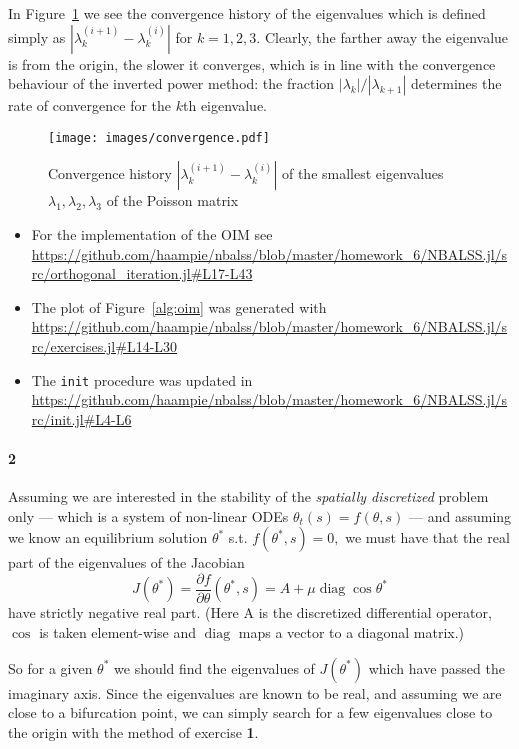 \documentclass[a4paper]{article}
\DeclareMathOperator{\diag}{diag}
\begin{document}
  In Figure~\ref{fig:lambda_conv} we see the convergence history of the eigenvalues which is defined simply as $|\lambda^{(i + 1)}_k - \lambda^{(i)}_k|$ for $k = 1, 2, 3.$ Clearly, the farther away the eigenvalue is from the origin, the slower it converges, which is in line with the convergence behaviour of the inverted power method: the fraction $|\lambda_k| / |\lambda_{k+1}|$ determines the rate of convergence for the $k$th eigenvalue.

  \begin{figure}[h]
    \caption{Convergence history $|\lambda^{(i + 1)}_k - \lambda^{(i)}_k|$ of the smallest eigenvalues $\lambda_1, \lambda_2, \lambda_3$ of the Poisson matrix}\label{fig:lambda_conv}
    \centerline{\texttt{[image: images/convergence.pdf]}}
  \end{figure}

  \begin{itemize}
    \item For the implementation of the OIM see \url{https://github.com/haampie/nbalss/blob/master/homework_6/NBALSS.jl/src/orthogonal_iteration.jl#L17-L43}
    \item The plot of Figure~\ref{alg:oim} was generated with \url{https://github.com/haampie/nbalss/blob/master/homework_6/NBALSS.jl/src/exercises.jl#L14-L30}
    \item The {\tt init} procedure was updated in \url{https://github.com/haampie/nbalss/blob/master/homework_6/NBALSS.jl/src/init.jl#L4-L6}
  \end{itemize}

  \paragraph{2} Assuming we are interested in the stability of the \emph{spatially discretized} problem only --- which is a system of non-linear ODEs $\theta_t(s) = f(\theta, s)$ --- and assuming we know an equilibrium solution $\theta^*$ s.t. $f(\theta^*, s) = 0,$ we must have that the real part of the eigenvalues of the Jacobian $$J(\theta^*) = \frac{\partial f}{\partial \theta}(\theta^*, s) = A + \mu \diag \cos \theta^*$$ have strictly negative real part. (Here A is the discretized differential operator, $\cos$ is taken element-wise and $\diag$ maps a vector to a diagonal matrix.)

  So for a given $\theta^*$ we should find the eigenvalues of $J(\theta^*)$ which have passed the imaginary axis. Since the eigenvalues are known to be real, and assuming we are close to a bifurcation point, we can simply search for a few eigenvalues close to the origin with the method of exercise {\bf 1}.
\end{document}
